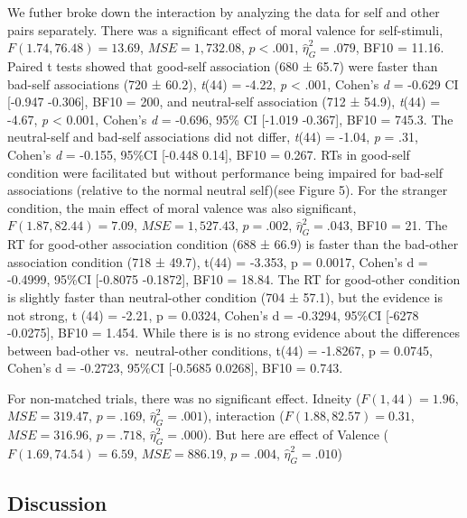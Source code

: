 \documentclass[man]{apa6}
\begin{document}
We futher broke down the interaction by analyzing the data for self and other pairs separately. There was a significant effect of moral valence for self-stimuli, \(F(1.74, 76.48) = 13.69\), \(\mathit{MSE} = 1,732.08\), \(p < .001\), \(\hat{\eta}^2_G = .079\), BF10 = 11.16. Paired t tests showed that good-self association (680 ± 65.7) were faster than bad-self associations (720 ± 60.2), \emph{t}(44) = -4.22, \emph{p} \textless{} .001, Cohen's \emph{d} = -0.629 CI {[}-0.947 -0.306{]}, BF10 = 200, and neutral-self association (712 ± 54.9), \emph{t}(44) = -4.67, \emph{p} \textless{} 0.001, Cohen's \emph{d} = -0.696, 95\% CI {[}-1.019 -0.367{]}, BF10 = 745.3. The neutral-self and bad-self associations did not differ, \emph{t}(44) = -1.04, \emph{p} = .31, Cohen's \emph{d} = -0.155, 95\%CI {[}-0.448 0.14{]}, BF10 = 0.267. RTs in good-self condition were facilitated but without performance being impaired for bad-self associations (relative to the normal neutral self)(see Figure 5).
For the stranger condition, the main effect of moral valence was also significant, \(F(1.87, 82.44) = 7.09\), \(\mathit{MSE} = 1,527.43\), \(p = .002\), \(\hat{\eta}^2_G = .043\), BF10 = 21. The RT for good-other association condition (688 ± 66.9) is faster than the bad-other association condition (718 ± 49.7), t(44) = -3.353, p = 0.0017, Cohen's d = -0.4999, 95\%CI {[}-0.8075 -0.1872{]}, BF10 = 18.84. The RT for good-other condition is slightly faster than neutral-other condition (704 ± 57.1), but the evidence is not strong, t (44) = -2.21, p = 0.0324, Cohen's d = -0.3294, 95\%CI {[}-6278 -0.0275{]}, BF10 = 1.454. While there is is no strong evidence about the differences between bad-other vs.~neutral-other conditions, t(44) = -1.8267, p = 0.0745, Cohen's d = -0.2723, 95\%CI {[}-0.5685 0.0268{]}, BF10 = 0.743.

For non-matched trials, there was no significant effect. Idneity (\(F(1, 44) = 1.96\), \(\mathit{MSE} = 319.47\), \(p = .169\), \(\hat{\eta}^2_G = .001\)), interaction (\(F(1.88, 82.57) = 0.31\), \(\mathit{MSE} = 316.96\), \(p = .718\), \(\hat{\eta}^2_G = .000\)). But here are effect of Valence (\(F(1.69, 74.54) = 6.59\), \(\mathit{MSE} = 886.19\), \(p = .004\), \(\hat{\eta}^2_G = .010\))

\hypertarget{discussion-4}{%
\subsection{Discussion}\label{discussion-4}}
\end{document}
